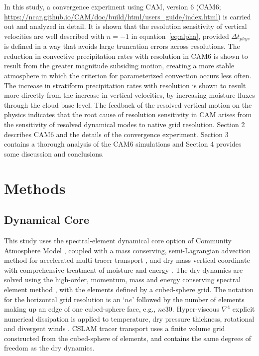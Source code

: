\documentclass[times]{qjrms4}
\begin{document}
In this study, a convergence experiment using CAM, version 6 (CAM6; \url{https://ncar.github.io/CAM/doc/build/html/users_guide/index.html}) is carried out and analyzed in detail. It is shown that the resolution sensitivity of vertical velocities are well described with $n=-1$ in equation~\eqref{eq:alpha}, provided $\Delta t_{phys}$ is defined in a way that avoids large truncation errors across resolutions. The reduction in convective precipitation rates with resolution in CAM6 is shown to result from the greater magnitude subsiding motion, creating a more stable atmosphere in which the criterion for parameterized convection occurs less often. The increase in stratiform precipitation rates with resolution is shown to result more directly from the increase in vertical velocities, by increasing moisture fluxes through the cloud base level. The feedback of the resolved vertical motion on the physics indicates that the root cause of resolution sensitivity in CAM arises from the sensitivity of resolved dynamical modes to native grid resolution. Section 2 describes CAM6 and the details of the convergence experiment. Section 3 contains a thorough analysis of the CAM6 simulations and Section 4 provides some discussion and conclusions.

\section{Methods}

\subsection{Dynamical Core}

This study uses the spectral-element dynamical core option of Community Atmosphere Model \citep[CAM-SE;][]{DetAl2012IJHPCA}, coupled with a mass conserving, semi-Lagrangian advection method for accelerated multi-tracer transport \citep[CSLAM;][]{LTOUNGK2017MWR}, and dry-mass vertical coordinate with comprehensive treatment of moisture and energy \citep{LetAl2018JAMES}. The dry dynamics are solved using the high-order, momentum, mass and energy conserving spectral element method \citep{TF2010JCP}, with the elements defined by a cubed-sphere grid. The notation for the horizontal grid resolution is an `$ne$' followed by the number of elements making up an edge of one cubed-sphere face, e.g., $ne30$. Hyper-viscous $\nabla^{4}$ explicit numerical dissipation is applied to temperature, dry pressure thickness, rotational and divergent winds \citep{LetAl2018JAMES}. CSLAM tracer transport uses a finite volume grid constructed from the cubed-sphere of elements, and contains the same degrees of freedom as the dry dynamics.
\end{document}
